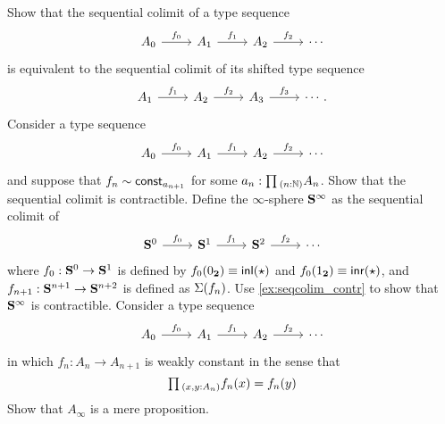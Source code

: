 \begin{exercises}
\exercise \label{ex:seqcolim_shift}
Show that the sequential colimit of a type sequence
\begin{equation*}
\begin{tikzcd}
A_0 \arrow[r,"f_0"] & A_1 \arrow[r,"f_1"] & A_2 \arrow[r,"f_2"] & \cdots
\end{tikzcd}
\end{equation*}
is equivalent to the sequential colimit of its shifted type sequence
\begin{equation*}
\begin{tikzcd}
A_1 \arrow[r,"f_1"] & A_2 \arrow[r,"f_2"] & A_3 \arrow[r,"f_3"] & \cdots.
\end{tikzcd}
\end{equation*}
\exercise \label{ex:seqcolim_contr}Consider a type sequence
\begin{equation*}
\begin{tikzcd}
A_0 \arrow[r,"f_0"] & A_1 \arrow[r,"f_1"] & A_2 \arrow[r,"f_2"] & \cdots
\end{tikzcd}
\end{equation*}
and suppose that $f_n\sim \mathsf{const}_{a_{n+1}}$ for some $a_n:\prd{n:\N}A_n$. Show that the sequential colimit is contractible.
\exercise Define the $\infty$-sphere $\mathbf{S}^{\infty}$ as the sequential colimit of
\begin{equation*}
\begin{tikzcd}
\sphere{0} \arrow[r,"f_0"] & \sphere{1} \arrow[r,"f_1"] & \sphere{2} \arrow[r,"f_2"] & \cdots
\end{tikzcd}
\end{equation*}
where $f_0:\mathbf{S}^{0}\to\mathbf{S}^{1}$ is defined by $f_0({0_{\mathbf{2}}})\equiv {\mathsf{inl}}(\star)$ and $f_0({1_{\mathbf{2}}})\equiv {\mathsf{inr}}(\star)$, and $f_{n+1}:\mathbf{S}^{n+1}\to\mathbf{S}^{n+2}$ is defined as $\Sigma(f_n)$. Use \cref{ex:seqcolim_contr} to show that $\mathbf{S}^{\infty}$ is contractible.
\exercise Consider a type sequence
\begin{equation*}
\begin{tikzcd}
A_0 \arrow[r,"f_0"] & A_1 \arrow[r,"f_1"] & A_2 \arrow[r,"f_2"] & \cdots
\end{tikzcd}
\end{equation*}
in which $f_n:A_n\to A_{n+1}$ is weakly constant in the sense that
\begin{equation*}
\prd{x,y:A_n} f_n(x)=f_n(y)
\end{equation*}
Show that $A_\infty$ is a mere proposition.
\end{exercises}
